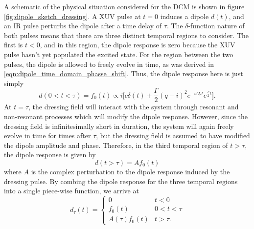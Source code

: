 A schematic of the physical situation considered for the DCM is shown in figure \ref{fig:dipole_sketch_dressing}.  A XUV pulse at $t=0$ induces a dipole $d(t)$, and an IR pulse perturbs the dipole after a time delay of $\tau$. The $\delta$-function nature of both pulses means that there are three distinct temporal regions to consider.  The first is $t<0$, and in this region, the dipole response is zero because the XUV pulse hasn't yet populated the excited state. For the region between the two pulses, the dipole is allowed to freely evolve in time, as was derived in \ref{eqn:dipole_time_domain_phasse_shift}. Thus, the dipole response here is just simply
\begin{equation}
	d(0<t<\tau)= f_0(t)\propto i\bigg[ c\delta(t) + \frac{\Gamma}{2}(q-i)^2 e^{-i\Omega_r t}e^{\frac{\Gamma}{2}t} \bigg].
\end{equation}
At $t=\tau$, the dressing field will interact with the system through resonant and non-resonant processes which will modify the dipole response.  However, since the dressing field is infinitesimally short in duration, the system will again freely evolve in time for times after $\tau$, but the dressing field is assumed to have modified the dipole amplitude and phase.  Therefore, in the third temporal region of $t>\tau$, the dipole response is given by
\begin{equation}
	d(t>\tau) = A f_0(t)
\end{equation}
where $A$ is the complex perturbation to the dipole response induced by the dressing pulse. By combing the dipole response for the three temporal regions into a single piece-wise function, we arrive at
\begin{equation}
\label{eqn:piecewise_dipole_t}
	d_\tau(t)=
	\begin{cases}
		0 & t<0\\
		f_0(t) & 0<t<\tau\\
		A(\tau)f_0(t) & t>\tau.
	\end{cases}
\end{equation}


